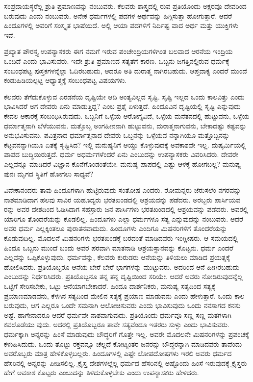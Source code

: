 ಸಂಪ್ರದಾಯಸ್ಥರೆಲ್ಲ ಶ್ರುತಿ ಪ್ರಮಾಣವನ್ನು ನಂಬುವರು. ಕೆಲವರು ಶಾಸ್ತ್ರದಲ್ಲಿ ರುವ ಪ್ರತಿಯೊಂದು ಅಕ್ಷರವೂ ದೇವರಿಂದ ಬರುವುದು ಎಂದು ನಂಬುವರು. ಅನೇಕ ಧರ್ಮಗಳಲ್ಲಿ ಪದಗಳ ಅರ್ಥವನ್ನು ಹಿಗ್ಗಿಸುತ್ತಾ ಹೋಗುತ್ತಾರೆ. ಆದರೆ ಹಿಂದೂಗಳಲ್ಲಿ ಅವರಿಗೆ ಸಂಸ್ಕೃತ ಭಾಷೆಯಿದೆ. ಅಲ್ಲಿ ಆಯಾ ಪದಗಳಿಗೆ ನಿರ್ದಿಷ್ಟ ವಾದ ಅರ್ಥ ಮತ್ತು ಯುಕ್ತಿಗಳು ಇವೆ.

ಪ್ರಖ್ಯಾತ ಪೌರಸ್ತ್ಯ ಉಪನ್ಯಾಸಕರು ಈಗ ನಮಗೆ ಇರುವ ಪಂಚೇಂದ್ರಿಯಗಳಿಗಿಂತ ಬಲವಾದ ಆರನೆಯ ಇಂದ್ರಿಯ ಒಂದಿದೆ ಎಂದು ಭಾವಿಸುವರು. ಇದೇ ಶ್ರುತಿ ಪ್ರಮಾಣದ ಸತ್ಯತೆಗೆ ಕಾರಣ. ಒಬ್ಬನು ಜಗತ್ತಿನಲ್ಲಿರುವ ಧರ್ಮಕ್ಕೆ ಸಂಬಂಧಪಟ್ಟ ಪುಸ್ತಕಗಳನ್ನೆಲ್ಲಾ ಓದಿರಬಹುದು, ಆದರೂ ಅತಿ ದುರಾತ್ಮ ನಾಗಿರಬಹುದು. ಆಪ್ತವಾಕ್ಯ ಎಂದರೆ ಮುಂದೆ ಕಂಡುಹಿಡಿಯಲ್ಪಟ್ಟ ಆಧ್ಯಾತ್ಮಕ್ಕೆ ಸಂಬಂಧಪಟ್ಟ ವಿಷಯಗಳು.

ಕೆಲವರು ತೆಗೆದುಕೊಳ್ಳುವ ಎರಡನೆಯ ದೃಷ್ಟಿಯೇ ಆದಿ ಅಂತ್ಯವಿಲ್ಲದ ಸೃಷ್ಟಿ. ಸೃಷ್ಟಿ ಇಲ್ಲದ ಒಂದು ಕಾಲವಿತ್ತು ಎಂದು ಭಾವಿಸಿದರೆ ಅಗ ದೇವರು ಏನು ಮಾಡುತ್ತಿದ್ದ? ಎಂಬ ಪ್ರಶ್ನೆ ಏಳುತ್ತದೆ. ಹಿಂದೂವಿನ ದೃಷ್ಟಿಯಲ್ಲಿ ಸೃಷ್ಟಿ ಎನ್ನುವುದು ಕೇವಲ ಆಕಾರಕ್ಕೆ ಸಂಬಂಧಿಸಿರುವುದು. ಒಬ್ಬನಿಗೆ ಒಳ್ಳೆಯ ಆರೋಗ್ಯವಿದೆ, ಒಳ್ಳೆಯ ಮನೆತನದಲ್ಲಿ ಹುಟ್ಟುವನು, ಒಳ್ಳೆಯ ಧರ್ಮಾತ್ಮನಾಗಿ ಬೆಳೆಯುವನು. ಮತ್ತೊಬ್ಬ ಅಂಗಹೀನನಾಗಿ ಹುಟ್ಟುವನು, ದುರಾತ್ಮನಾಗುವನು, ಬೇಕಾದಷ್ಟು ಕಷ್ಟವನ್ನು ಅನುಭವಿಸುವನು. ಪವಿತ್ರನಾದ ಧರ್ಮಾತ್ಮನಾದ ದೇವರು ಒಬ್ಬನನ್ನು ಒಳ್ಳೆಯವ ನನ್ನಾಗಿಯೂ ಮತ್ತೊಬ್ಬನನ್ನು ಕೆಟ್ಟವನನ್ನಾಗಿಯೂ ಏತಕ್ಕೆ ಸೃಷ್ಟಿಸಿದ? ಇಲ್ಲಿ ಮನುಷ್ಯನಿಗೆ ಆಯ್ದು ಕೊಳ್ಳುವುದಕ್ಕೆ ಅವಕಾಶವೇ ಇಲ್ಲ. ದುಷ್ಕರ್ಮಿಯಲ್ಲಿ ಪಾಪದ ಬುದ್ಧಿಯಿರುತ್ತದೆ. ಧರ್ಮ ಅಧರ್ಮಗಳೆಂದರೆ ಏನು ಎಂಬುದನ್ನು ಉಪನ್ಯಾಸಕರು ವಿವರಿಸಿದರು. ದೇವರೇ ಎಲ್ಲವನ್ನೂ ಮಾಡಿದರೆ ವಿಜ್ಞಾನ ಕೊನೆಗೊಂಡಂತೆಯೇ. ಮನುಷ್ಯ ಪಾಪದಲ್ಲಿ ಎಷ್ಟು ಆಳಕ್ಕೆ ಹೋಗಬಲ್ಲ? ಮನುಷ್ಯ ಪುನಃ ಮೃಗದ ಸ್ಥಿತಿಗೆ ಹೋಗಲು ಸಾಧ್ಯವೆ?

ವಿವೇಕಾನಂದರು ತಾವು ಹಿಂದೂಗಳಾಗಿ ಹುಟ್ಟಿರುವುದು ಸಂತೋಷ ಎಂದರು. ರೋಮನ್ನರು ಜೆರುಸಲೆಂ ನಗರವನ್ನು ನಾಶಮಾಡಿದಾಗ ಹಲವು ಸಾವಿರ ಯಹೂದ್ಯರು ಭರತಖಂಡದಲ್ಲಿ ಆಶ್ರಯವನ್ನು ಪಡೆದರು. ಅರಬ್ಬರು ಪಾರ್ಸಿಯವ ರನ್ನು ಅವರ ದೇಶದಿಂದ ಓಡಿಸಿದಾಗ ಸಹಸ್ರಾರು ಜನ ಪಾರ್ಸಿಗಳು ಭರತಖಂಡದಲ್ಲಿ ಆಶ್ರಯವನ್ನು ಪಡೆದರು. ಅವರಲ್ಲಿ ಯಾರಿಗೂ ತೊಂದರೆಯನ್ನು ಕೊಡಲಿಲ್ಲ. ಹಿಂದೂಗಳು ಎಲ್ಲಾ ಧರ್ಮಗಳೂ ಸತ್ಯ ಎನ್ನುವುದನ್ನು ನಂಬುವರು. ಆದರೆ ಅವರ ಧರ್ಮ ಎಲ್ಲಕ್ಕಿಂತಲೂ ಪುರಾತನವಾದುದು. ಹಿಂದೂಗಳು ಎಂದಿಗೂ ಮಿಷನರಿಗಳಿಗೆ ತೊಂದರೆಯನ್ನು ಕೊಡುವುದಿಲ್ಲ. ಮೊದಲನೆ ಮಿಷನರಿಗಳು ಭರತಖಂಡಕ್ಕೆ ಬರದಂತೆ ಮಾಡಿದವರು ಇಂಗ್ಲೀಷರು. ಆ ಸಮಯದಲ್ಲಿ ಹಿಂದೂ ಒಬ್ಬನು ಮುಂದೆ ಬಂದು ಅವರ ಪರವಾಗಿ ಮಾತನಾಡಿ ಆಶ್ರಯಸ್ಥಾನವನ್ನು ಕೊಟ್ಟನು. ಧರ್ಮ ಎಂದರೆ ಎಲ್ಲವನ್ನು ಒಪ್ಪಿಕೊಳ್ಳುವುದು. ಧರ್ಮವನ್ನು, ಕೆಲವರು ಕುರುಡರು ಆನೆಯನ್ನು ತಿಳಿಯಲು ಮಾಡಿದ ಪ್ರಯತ್ನಕ್ಕೆ ಹೋಲಿಸಿದರು. ಪ್ರತಿಯೊಬ್ಬರೂ ಆನೆಯ ಬೇರೆ ಬೇರೆ ಭಾಗಗಳನ್ನು ಮುಟ್ಟುವರು. ಅದರಿಂದ ಆನೆ ಹೀಗಿರಬಹುದು ಎಂಬುದನ್ನು ನಿರ್ಧರಿಸಿದರು. ಪ್ರತಿಯೊಬ್ಬನೂ ತನ್ನ ತನ್ನ ದೃಷ್ಟಿಯಿಂದ ಸರಿಯೇ. ಆದರೆ ಅವರು ನೋಡಿರುವುದನ್ನೆಲ್ಲ ಒಟ್ಟಿಗೆ ಸೇರಿಸಬೇಕು, ಒಟ್ಟು ಆನೆಯಾಗಬೇಕಾದರೆ. ಹಿಂದೂ ದಾರ್ಶನಿಕರು, ಮನುಷ್ಯ ಸತ್ಯದಿಂದ ಸತ್ಯಕ್ಕೆ ಪ್ರಯಾಣಮಾಡವನು, ಕೆಳಗಿನ ಸತ್ಯದಿಂದ ಮೇಲಿನ ಸತ್ಯಕ್ಕೆ ಪ್ರಯಾಣ ಮಾಡುವನು ಎಂದು ಹೇಳುತ್ತಾರೆ. ಒಂದು ಕಾಲ ಬರುವುದು, ಆಗ ಎಲ್ಲರೂ ಒಂದೇ ಸಮನಾಗಿ ಆಲೋಚಿಸುವರು ಎಂದು ಭಾವಿಸುವುದು ಒಂದು ನನಸಾಗದ ಕನಸು ಅಷ್ಟೆ. ಹಾಗೇನಾದರೂ ಆದರೆ ಧರ್ಮವೇ ನಾಶವಾಗುವುದು. ಪ್ರತಿಯೊಂದು ಧರ್ಮವೂ ಸಣ್ಣ ಸಣ್ಣ ಮತಗಳಾಗಿ ಕವಲೊಡೆಯು ವುದು. ಅದರಲ್ಲಿ ಪ್ರತಿಯೊಬ್ಬರೂ ತಾವೇ ಸತ್ಯವೆಂದೂ ಇತರರು ಸುಳ್ಳು ಎಂದು ಭಾವಿಸುವರು. ಧರ್ಮಕ್ಕಾಗಿ ಅನ್ಯರನ್ನು ಹಿಂಸೆ ಮಾಡುವುದು ಬೌದ್ಧರಿಗೆ ಗೊತ್ತೇ ಇಲ್ಲ. ಅವರೇ ಮೊದಲನೇ ಮಿಷನರಿಗಳನ್ನು ಪ್ರಪಂಚಕ್ಕೆ ಕಳುಹಿಸಿದುದು. ಒಂದು ತೊಟ್ಟು ರಕ್ತವನ್ನೂ ಚೆಲ್ಲದೆ ಕೋಟ್ಯಂತರ ಜನರನ್ನು ಬೌದ್ಧರನ್ನಾಗಿ ಮಾಡಿದವರು ತಾವೆಂದು ಅವರೊಬ್ಬರು ಮಾತ್ರ ಹೇಳಿಕೊಳ್ಳಬಲ್ಲರು. ಹಿಂದೂಗಳಲ್ಲಿ ಎಷ್ಟೇ ಲೋಪದೋಷಗಳು ಇರಲಿ ಅವರು ಧರ್ಮದ ಹೆಸರಿನಲ್ಲಿ ಅನ್ಯರನ್ನು ಪೀಡಿಸಲಿಲ್ಲ. ಕ್ರೈಸ್ತ ದೇಶಗಳಲ್ಲೆಲ್ಲ ಧರ್ಮದ ಹೆಸರಿನಲ್ಲಿ ಅಷ್ಟೊಂದು ಹಿಂಸೆ ಇರುವುದಕ್ಕೆ ಕ್ರೈಸ್ತರು ಹೇಗೆ ಅವಕಾಶ ಕೊಟ್ಟರು ಎಂಬುದನ್ನು ತಿಳಿದುಕೊಳ್ಳಬೇಕು ಎಂದು ಉಪನ್ಯಾಸಕರು ಹೇಳಿದರು.

